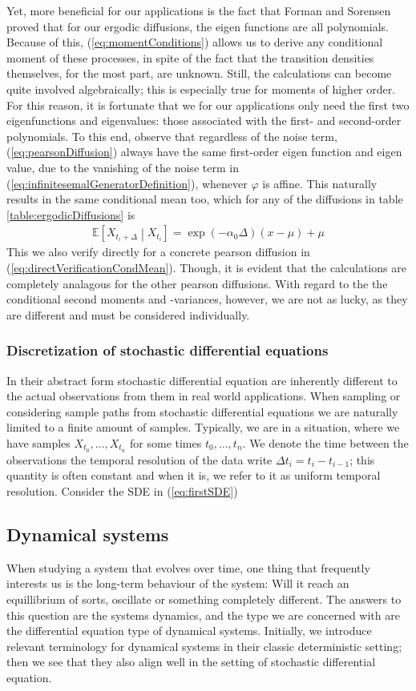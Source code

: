 Yet, more beneficial for our applications is the fact that Forman and Sorensen \cite{FormanSorensen2008} proved that for our ergodic diffusions, the eigen functions are all polynomials. Because of this, (\ref{eq:momentConditions}) allows us to derive any conditional moment of these processes, in spite of the fact that the transition densities themselves, for the most part, are unknown. Still, the calculations can become quite involved algebraically; this is especially true for moments of higher order. For this reason, it is fortunate that we for our applications only need the first two eigenfunctions and eigenvalues: those associated with the first- and second-order polynomials. To this end, observe that regardless of the noise term, (\ref{eq:pearsonDiffusion}) always have the same first-order eigen function and eigen value, due to the vanishing of the noise term in (\ref{eq:infinitesemalGeneratorDefinition}), whenever $\varphi$ is affine. This naturally results in the same conditional mean too, which for any of the diffusions in table \ref{table:ergodicDiffusions} is
\begin{align}
    \mathbb{E}\left[X_{t_{i}+\Delta} \middle|X_{t_{i}} \right] = \exp\left(-\alpha_0\Delta\right)\left(x-\mu\right) + \mu
\end{align}
This we also verify directly for a concrete pearson diffusion in (\ref{eq:directVerificationCondMean}). Though, it is evident that the calculations are completely analagous for the other pearson diffusions. With regard to the the conditional second moments and -variances, however, we are not as lucky, as they are different and must be considered individually.
\subsubsection{Discretization of stochastic differential equations}
In their abstract form stochastic differential equation are inherently different to the actual observations from them in real world applications.
When sampling or considering sample paths from stochastic differential equations we are naturally limited to a finite amount of samples. Typically, we are in a situation, where we have samples $X_{t_0},\dots,X_{t_n}$ for some times $t_0,\dots,t_n$. We denote the time between the observations the temporal resolution of the data write $\Delta t_i = t_{i} - t_{i - 1}$; this quantity is often constant and when it is, we refer to it as uniform temporal resolution.
Consider the SDE in (\ref{eq:firstSDE})
\subsection{Dynamical systems}
When studying a system that evolves over time, one thing that frequently interests us is the long-term behaviour of the system: Will it reach an equillibrium of sorts, oscillate or something completely different. The answers to this question are the systems dynamics, and the type we are concerned with are the differential equation type of dynamical systems. Initially, we introduce relevant terminology for dynamical systems in their classic deterministic setting; then we see that they also align well in the setting of stochastic differential equation. 
